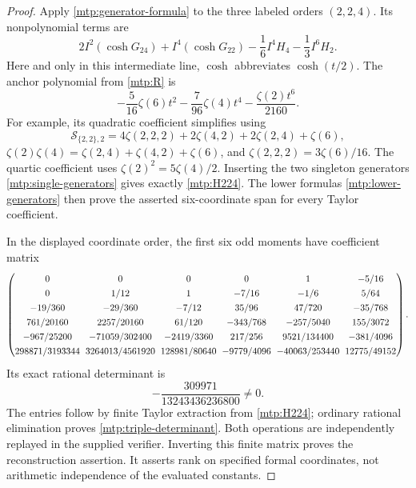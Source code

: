 \begin{proof}
Apply \eqref{mtp:generator-formula} to the three labeled orders
$(2,2,4)$. Its nonpolynomial terms are
\[
 2I^2(\cosh G_{24})+I^4(\cosh G_{22})
                      -\frac16I^4H_4-\frac13I^6H_2.
\]
Here and only in this intermediate line, $\cosh$ abbreviates
$\cosh(t/2)$. The anchor polynomial from \eqref{mtp:R} is
\[
          -\frac5{16}\zeta(6)t^2-\frac7{96}\zeta(4)t^4
                                      -\frac{\zeta(2)t^6}{2160}.
\]
For example, its quadratic coefficient simplifies using
\[
 \mathcal S_{\{2,2\},2}
  =4\zeta(2,2,2)+2\zeta(4,2)+2\zeta(2,4)+\zeta(6),
\]
$\zeta(2)\zeta(4)=\zeta(2,4)+\zeta(4,2)+\zeta(6)$, and
$\zeta(2,2,2)=3\zeta(6)/16$. The quartic coefficient uses
$\zeta(2)^2=5\zeta(4)/2$. Inserting the two singleton generators
\eqref{mtp:single-generators} gives exactly \eqref{mtp:H224}.
The lower formulas \eqref{mtp:lower-generators} then prove the asserted
six-coordinate span for every Taylor coefficient.

In the displayed coordinate order, the first six odd moments have
coefficient matrix
\begin{equation}\label{mtp:triple-matrix}
\begingroup\setlength{\arraycolsep}{3pt}\renewcommand{\arraystretch}{1.3}
\begin{pmatrix}
0&0&0&0&1&-5/16\\
0&1/12&1&-7/16&-1/6&5/64\\
-19/360&-29/360&-7/12&35/96&47/720&-35/768\\
761/20160&2257/20160&61/120&-343/768&-257/5040&155/3072\\
-967/25200&-71059/302400&-2419/3360&217/256&9521/134400&-381/4096\\
298871/3193344&3264013/4561920&128981/80640&-9779/4096&-40063/253440&12775/49152
\end{pmatrix}.
\endgroup
\end{equation}
Its exact rational determinant is
\begin{equation}\label{mtp:triple-determinant}
                         -\frac{309971}{13243436236800}\ne0.
\end{equation}
The entries follow by finite Taylor extraction from
\eqref{mtp:H224}; ordinary rational elimination proves
\eqref{mtp:triple-determinant}. Both operations are independently
replayed in the supplied verifier. Inverting this finite matrix proves
the reconstruction assertion. It asserts rank on specified formal
coordinates, not arithmetic independence of the evaluated constants.
\end{proof}

